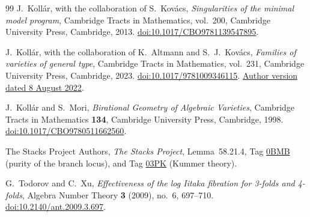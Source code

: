 \begin{thebibliography}{99}
J.~Koll\'ar, with the collaboration of S.~Kov\'acs,
\emph{Singularities of the minimal model program},
Cambridge Tracts in Mathematics, vol.~200,
Cambridge University Press, Cambridge, 2013.
\href{https://doi.org/10.1017/CBO9781139547895}{doi:10.1017/CBO9781139547895}.

J.~Koll\'ar, with the collaboration of K.~Altmann and S.~J.~Kov\'acs,
\emph{Families of varieties of general type},
Cambridge Tracts in Mathematics, vol.~231,
Cambridge University Press, Cambridge, 2023.
\href{https://doi.org/10.1017/9781009346115}{doi:10.1017/9781009346115}.
\href{https://web.math.princeton.edu/~kollar/FromMyHomePage/modbook-final.pdf}{Author version dated 8 August 2022}.

J.~Koll\'ar and S.~Mori,
\emph{Birational Geometry of Algebraic Varieties},
Cambridge Tracts in Mathematics \textbf{134},
Cambridge University Press, Cambridge, 1998.
\href{https://doi.org/10.1017/CBO9780511662560}{doi:10.1017/CBO9780511662560}.

The Stacks Project Authors,
\emph{The Stacks Project},
Lemma~58.21.4, Tag
\href{https://stacks.math.columbia.edu/tag/0BMB}{0BMB}
(purity of the branch locus), and Tag
\href{https://stacks.math.columbia.edu/tag/03PK}{03PK}
(Kummer theory).

G.~Todorov and C.~Xu,
\emph{Effectiveness of the log Iitaka fibration for 3-folds and 4-folds},
Algebra Number Theory \textbf{3} (2009), no.~6, 697--710.
\href{https://doi.org/10.2140/ant.2009.3.697}{doi:10.2140/ant.2009.3.697}.

\end{thebibliography}
